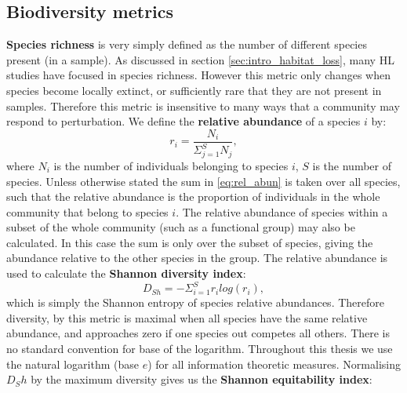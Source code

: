 

\subsection{Biodiversity metrics}
\label{sec:define_dviersity}

\textbf{Species richness} is very simply defined as the number of different species present (in a sample). As discussed in section \ref{sec:intro_habitat_loss}, many HL studies have focused in species richness. However this metric only changes when species become locally extinct, or sufficiently rare that they are not present in samples. Therefore this metric is insensitive to many ways that a community may respond to perturbation. We define the \textbf{relative abundance} of a species $i$ by:
\begin{equation}
r_i = \frac{N_i}{\Sigma_{j=1}^S N_j},
\label{eq:rel_abun}
\end{equation}
%
where $N_i$ is the number of individuals belonging to species $i$, $S$ is the number of species. Unless otherwise stated the sum in \eqref{eq:rel_abun} is taken over all species, such that the relative abundance is the proportion of individuals in the whole community that belong to species $i$. The relative abundance of species within a subset of the whole community (such as a functional group) may also be calculated. In this case the sum is only over the subset of species, giving the abundance relative to the other species in the group. The relative abundance is used to calculate the \textbf{Shannon diversity index}:
\begin{equation}
D_{Sh} = -\Sigma_{i=1}^S r_i log( r_i),
\label{eq:shan_div}
\end{equation}
%
which is simply the Shannon entropy of species relative abundances. Therefore diversity, by this metric is maximal when all species have the same relative abundance, and approaches zero if one species out competes all others. There is no standard convention for base of the logarithm. Throughout this thesis we use the natural logarithm (base $e$) for all information theoretic measures. Normalising $D_Sh$ by the maximum diversity gives us the \textbf{Shannon equitability index}:
